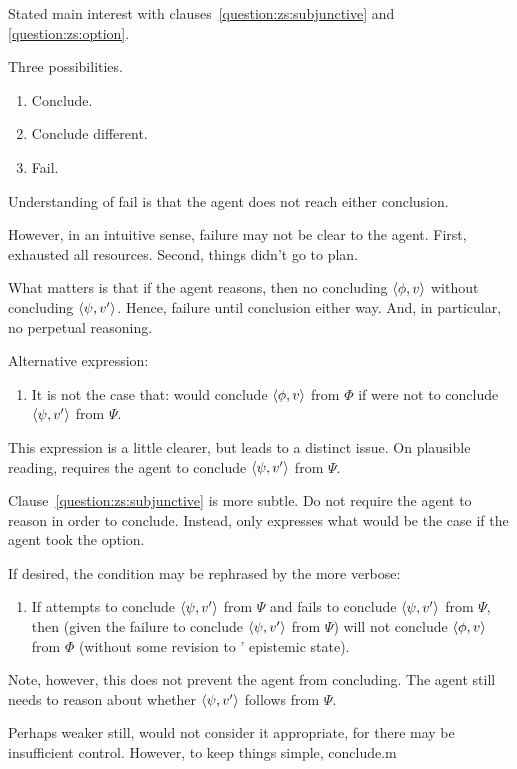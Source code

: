 \begin{note}
  Stated main interest with clauses~\ref{question:zs:subjunctive} and \ref{question:zs:option}.

  Three possibilities.
  \begin{enumerate}
  \item Conclude.
  \item Conclude different.
  \item Fail.
  \end{enumerate}

  Understanding of fail is that the agent does not reach either conclusion.

  However, in an intuitive sense, failure may not be clear to the agent.
  First, exhausted all resources.
  Second, things didn't go to plan.

  What matters is that if the agent reasons, then no concluding \(\langle \phi, v \rangle\) without concluding \(\langle \psi, v' \rangle\).
  Hence, failure until conclusion either way.
  And, in particular, no perpetual reasoning.

  Alternative expression:

  \begin{enumerate}
  \item
    \label{question:zs:subjunctive-non-trivial}
    It is not the case that: \vAgent{} would conclude \(\langle \phi, v \rangle\) from \(\Phi\) if \vAgent{} were not to conclude \(\langle \psi, v' \rangle\) from \(\Psi\).
  \end{enumerate}

  This expression is a little clearer, but leads to a distinct issue.
  On plausible reading, requires the agent to conclude \(\langle \psi, v' \rangle\) from \(\Psi\).

  Clause~\ref{question:zs:subjunctive} is more subtle.
  Do not require the agent to reason in order to conclude.
  Instead, only expresses what would be the case if the agent took the option.

  If desired, the condition may be rephrased by the more verbose:

  \begin{enumerate}
  \item
    If \vAgent{} attempts to conclude \(\langle \psi, v' \rangle\) from \(\Psi\) and fails to conclude \(\langle \psi, v' \rangle\) from \(\Psi\), then (given the failure to conclude \(\langle \psi, v' \rangle\) from \(\Psi\)) \vAgent{} will not conclude \(\langle \phi, v \rangle\) from \(\Phi\) (without some revision to \vAgent{}' epistemic state).
  \end{enumerate}

  






  Note, however, this does not prevent the agent from concluding.
  The agent still needs to reason about whether \(\langle \psi, v' \rangle\) follows from \(\Psi\).

  Perhaps weaker still, would not consider it appropriate, for there may be insufficient control.
  However, to keep things simple, conclude.m
\end{note}

